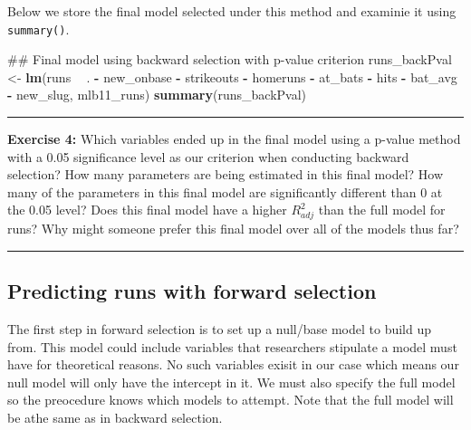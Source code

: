 \documentclass[]{book}
\newenvironment{Shaded}{\begin{snugshade}}{\end{snugshade}}
\newcommand{\KeywordTok}[1]{\textcolor[rgb]{0.13,0.29,0.53}{\textbf{#1}}}
\newcommand{\NormalTok}[1]{#1}
\newcommand{\OperatorTok}[1]{\textcolor[rgb]{0.81,0.36,0.00}{\textbf{#1}}}
\newcommand{\StringTok}[1]{\textcolor[rgb]{0.31,0.60,0.02}{#1}}
\theoremstyle{definition}
\theoremstyle{definition}
\theoremstyle{definition}
\theoremstyle{remark}
\begin{document}
Below we store the final model selected under this method and examinie
it using \texttt{summary()}.

\begin{Shaded}
\begin{Highlighting}[]
\NormalTok{## Final model using backward selection with p-value criterion}
\NormalTok{runs_backPval <-}\StringTok{ }\KeywordTok{lm}\NormalTok{(runs }\OperatorTok{~}\StringTok{ }\NormalTok{. }\OperatorTok{-}\StringTok{ }\NormalTok{new_onbase }\OperatorTok{-}\StringTok{ }\NormalTok{strikeouts }\OperatorTok{-}\StringTok{ }\NormalTok{homeruns }\OperatorTok{-}\StringTok{ }\NormalTok{at_bats }\OperatorTok{-}\StringTok{ }\NormalTok{hits  }\OperatorTok{-}\StringTok{ }\NormalTok{bat_avg }\OperatorTok{-}\StringTok{ }\NormalTok{new_slug, mlb11_runs)}
\KeywordTok{summary}\NormalTok{(runs_backPval)}
\end{Highlighting}
\end{Shaded}

\begin{center}\rule{0.5\linewidth}{\linethickness}\end{center}

\textbf{Exercise 4:} Which variables ended up in the final model using a
p-value method with a 0.05 significance level as our criterion when
conducting backward selection? How many parameters are being estimated
in this final model? How many of the parameters in this final model are
significantly different than 0 at the 0.05 level? Does this final model
have a higher \(R^2_{adj}\) than the full model for runs? Why might
someone prefer this final model over all of the models thus far?

\begin{center}\rule{0.5\linewidth}{\linethickness}\end{center}

\hypertarget{predicting-runs-with-forward-selection}{%
\subsection{Predicting runs with forward
selection}\label{predicting-runs-with-forward-selection}}

The first step in forward selection is to set up a null/base model to
build up from. This model could include variables that researchers
stipulate a model must have for theoretical reasons. No such variables
exisit in our case which means our null model will only have the
intercept in it. We must also specify the full model so the preocedure
knows which models to attempt. Note that the full model will be athe
same as in backward selection.
\end{document}
